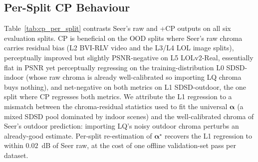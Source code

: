 \subsection{Per-Split CP Behaviour}\label{app:cp_per_split}

Table~\ref{tab:cp_per_split} contrasts Seer's raw and +CP outputs on all six evaluation splits. CP is beneficial on the OOD splits where Seer's raw chroma carries residual bias (L2 BVI-RLV video and the L3/L4 LOL image splits), perceptually improved but slightly PSNR-negative on L5 LOLv2-Real, essentially flat in PSNR yet perceptually regressing on the training-distribution L0 SDSD-indoor (whose raw chroma is already well-calibrated so importing LQ chroma buys nothing), and net-negative on both metrics on L1 SDSD-outdoor, the one split where CP regresses both metrics. We attribute the L1 regression to a mismatch between the chroma-residual statistics used to fit the universal $\boldsymbol{\alpha}$ (a mixed SDSD pool dominated by indoor scenes) and the well-calibrated chroma of Seer's outdoor prediction: importing LQ's noisy outdoor chroma perturbs an already-good estimate. Per-split re-estimation of $\boldsymbol{\alpha}^{\star}$ recovers the L1 regression to within $0.02$~dB of Seer raw, at the cost of one offline validation-set pass per dataset.

